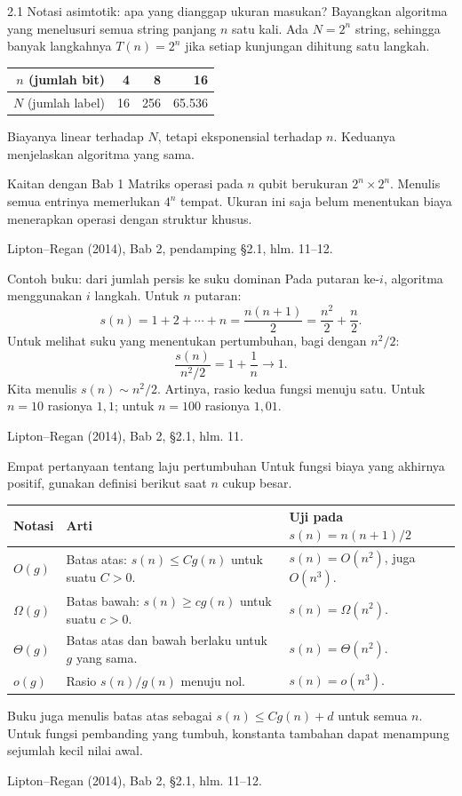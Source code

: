 \documentclass[aspectratio=169,11pt]{beamer}
\newcommand{\bookref}[1]{\par\vfill{\scriptsize\color{gray}Lipton--Regan (2014), Bab 2, #1.}}
\begin{document}
\begin{frame}{2.1 Notasi asimtotik: apa yang dianggap ukuran masukan?}
Bayangkan algoritma yang menelusuri semua string panjang $n$ satu kali. Ada $N=2^n$ string, sehingga banyak langkahnya $T(n)=2^n$ jika setiap kunjungan dihitung satu langkah.
\begin{center}\begin{tabular}{r|rrr}
$n$ (jumlah bit) &4&8&16\\\hline
$N$ (jumlah label) &16&256&65.536
\end{tabular}\end{center}
Biayanya linear terhadap $N$, tetapi eksponensial terhadap $n$. Keduanya menjelaskan algoritma yang sama.
\begin{block}{Kaitan dengan Bab 1}
Matriks operasi pada $n$ qubit berukuran $2^n\times2^n$. Menulis semua entrinya memerlukan $4^n$ tempat. Ukuran ini saja belum menentukan biaya menerapkan operasi dengan struktur khusus.
\end{block}
\bookref{pendamping \S2.1, hlm. 11--12}
\end{frame}

\begin{frame}{Contoh buku: dari jumlah persis ke suku dominan}
Pada putaran ke-$i$, algoritma menggunakan $i$ langkah. Untuk $n$ putaran:
\[
s(n)=1+2+\cdots+n=\frac{n(n+1)}2=\frac{n^2}{2}+\frac n2.
\]
Untuk melihat suku yang menentukan pertumbuhan, bagi dengan $n^2/2$:
\[
\frac{s(n)}{n^2/2}=1+\frac1n\longrightarrow1.
\]
Kita menulis $s(n)\sim n^2/2$. Artinya, rasio kedua fungsi menuju satu. Untuk $n=10$ rasionya $1{,}1$; untuk $n=100$ rasionya $1{,}01$.
\bookref{\S2.1, hlm. 11}
\end{frame}

\begin{frame}{Empat pertanyaan tentang laju pertumbuhan}
\small Untuk fungsi biaya yang akhirnya positif, gunakan definisi berikut saat $n$ cukup besar.
\begin{center}\begin{tabular}{lp{5.3cm}p{5.2cm}}\toprule
Notasi & Arti & Uji pada $s(n)=n(n+1)/2$\\\midrule
$O(g)$ & Batas atas: $s(n)\le Cg(n)$ untuk suatu $C>0$. & $s(n)=O(n^2)$, juga $O(n^3)$.\\[2mm]
$\Omega(g)$ & Batas bawah: $s(n)\ge cg(n)$ untuk suatu $c>0$. & $s(n)=\Omega(n^2)$.\\[2mm]
$\Theta(g)$ & Batas atas dan bawah berlaku untuk $g$ yang sama. & $s(n)=\Theta(n^2)$.\\[2mm]
$o(g)$ & Rasio $s(n)/g(n)$ menuju nol. & $s(n)=o(n^3)$.\\\bottomrule
\end{tabular}\end{center}
Buku juga menulis batas atas sebagai $s(n)\le Cg(n)+d$ untuk semua $n$. Untuk fungsi pembanding yang tumbuh, konstanta tambahan dapat menampung sejumlah kecil nilai awal.
\bookref{\S2.1, hlm. 11--12}
\end{frame}
\end{document}

